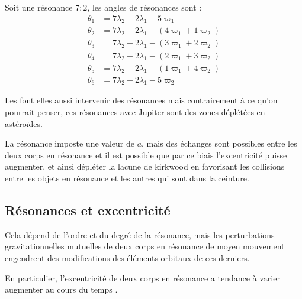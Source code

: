 \begin{exemple}
Soit une résonance $7:2$, les angles de résonances sont :
\begin{align*}
\theta_1 &= 7 \lambda_2 -2\lambda_1 - 5 \varpi_1\\
\theta_2 &= 7 \lambda_2 -2\lambda_1 - \left( 4 \varpi_1 + 1\varpi_2 \right)\\
\theta_3 &= 7 \lambda_2 -2\lambda_1 - \left( 3 \varpi_1 + 2\varpi_2 \right)\\
\theta_4 &= 7 \lambda_2 -2\lambda_1 - \left( 2 \varpi_1 + 3\varpi_2 \right)\\
\theta_5 &= 7 \lambda_2 -2\lambda_1 - \left( 1 \varpi_1 + 4\varpi_2 \right)\\
\theta_6 &= 7 \lambda_2 -2\lambda_1 - 5 \varpi_2
\end{align*}
\end{exemple}

\begin{remarque}
Les  font elles aussi intervenir des résonances mais contrairement à ce qu'on pourrait penser, ces résonances avec Jupiter sont des zones déplétées en astéroïdes. 

La résonance imposte une valeur de $a$, mais des échanges sont possibles entre les deux corps en résonance et il est possible que par ce biais l'excentricité puisse augmenter, et ainsi dépléter la lacune de kirkwood en favorisant les collisions entre les objets en résonance et les autres qui sont dans la ceinture.
\end{remarque}


\subsection{Résonances et excentricité}
Cela dépend de l'ordre et du degré de la résonance, mais les perturbations gravitationnelles mutuelles de deux corps en résonance de moyen mouvement engendrent des modifications des éléments orbitaux de ces derniers. 

En particulier, l'excentricité de deux corps en résonance a tendance à varier augmenter au cours du temps \citep[eq. (8.29)]{murray2000solar}. 

